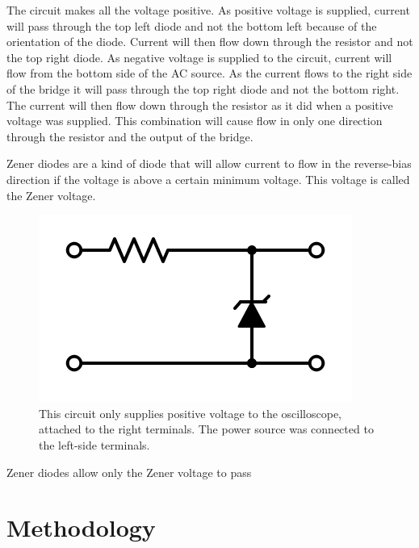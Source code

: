 \documentclass[twocolumn, amsmath]{revtex4}
\begin{document}
The circuit makes all the voltage positive. As positive voltage is supplied, current will pass through the top left diode and not the bottom left because of the orientation of the diode. Current will then flow down through the resistor and not the top right diode. As negative voltage is supplied to the circuit, current will flow from the bottom side of the AC source. As the current flows to the right side of the bridge it will pass through the top right diode and not the bottom right. The current will then flow down through the resistor as it did when a positive voltage was supplied. This combination will cause flow in only one direction through the resistor and the output of the bridge.

Zener diodes are a kind of diode that will allow current to flow in the reverse-bias direction if the voltage is above a certain minimum voltage. This voltage is called the Zener voltage.

\begin{figure}
    \includegraphics[scale=0.3]{zener.png}  
    \caption{This circuit only supplies positive voltage to the oscilloscope, attached to the right terminals. The power source was connected to the left-side terminals.}
\end{figure}

Zener diodes allow only the Zener voltage to pass 





\section{Methodology}
\end{document}

